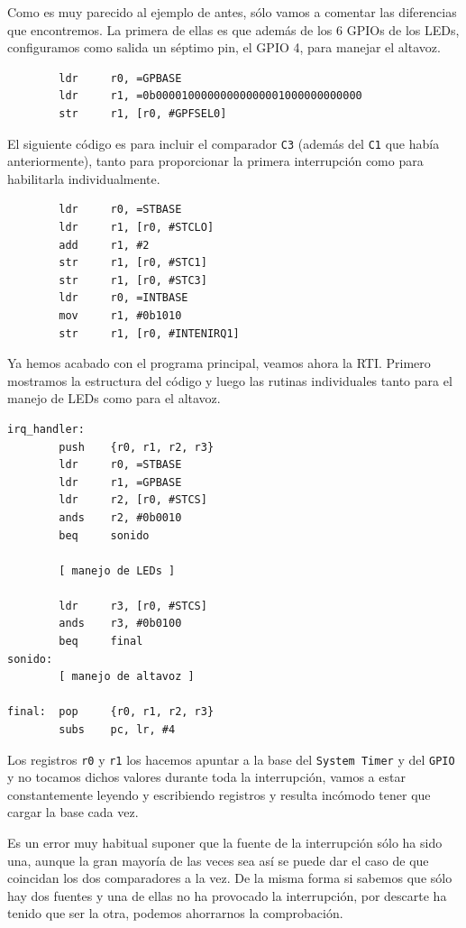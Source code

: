 Como es muy parecido al ejemplo de antes, sólo vamos a comentar las diferencias que encontremos.
La primera de ellas es que además de los 6 GPIOs de los LEDs, configuramos como salida un séptimo
pin, el GPIO 4, para manejar el altavoz.

\begin{lstlisting}
        ldr     r0, =GPBASE
        ldr     r1, =0b00001000000000000001000000000000
        str     r1, [r0, #GPFSEL0]
\end{lstlisting}

El siguiente código es para incluir el comparador {\tt C3} (además del {\tt C1} que había
anteriormente), tanto para proporcionar la primera
interrupción como para habilitarla individualmente.

\begin{lstlisting}
        ldr     r0, =STBASE
        ldr     r1, [r0, #STCLO]
        add     r1, #2
        str     r1, [r0, #STC1]
        str     r1, [r0, #STC3]
        ldr     r0, =INTBASE
        mov     r1, #0b1010
        str     r1, [r0, #INTENIRQ1]
\end{lstlisting}

Ya hemos acabado con el programa principal, veamos ahora la RTI. Primero mostramos la estructura
del código y luego las rutinas individuales tanto para el manejo de LEDs como para el
altavoz.

\begin{lstlisting}
irq_handler:
        push    {r0, r1, r2, r3}
        ldr     r0, =STBASE
        ldr     r1, =GPBASE
        ldr     r2, [r0, #STCS]
        ands    r2, #0b0010
        beq     sonido

        [ manejo de LEDs ]

        ldr     r3, [r0, #STCS]
        ands    r3, #0b0100
        beq     final
sonido:
        [ manejo de altavoz ]

final:  pop     {r0, r1, r2, r3}
        subs    pc, lr, #4
\end{lstlisting}

Los registros {\tt r0} y {\tt r1} los hacemos apuntar a la base del {\tt System Timer} y del
{\tt GPIO} y no tocamos dichos valores durante toda la interrupción, vamos a estar
constantemente leyendo y escribiendo registros y resulta incómodo tener que cargar la
base cada vez.

Es un error muy habitual suponer que la fuente de la interrupción sólo ha sido una, aunque
la gran mayoría de las veces sea así se puede dar el caso de que coincidan los dos comparadores
a la vez. De la misma forma si sabemos que sólo hay dos fuentes y una de ellas no ha
provocado la interrupción, por descarte ha tenido que ser la otra, podemos ahorrarnos la
comprobación.

